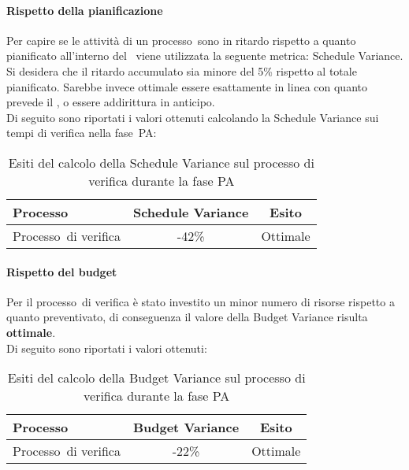 \documentclass[../PianoDiQualifica.tex]{subfiles}
\begin{document}
\begin{appendices}
			\paragraph{Rispetto della pianificazione}
			Per capire se le attività di un processo\g\ sono in ritardo rispetto a quanto pianificato all'interno del \pianodiprogetto\ viene utilizzata la seguente metrica: Schedule Variance.\\
			Si desidera che il ritardo accumulato sia minore del 5\% rispetto al totale pianificato. Sarebbe invece ottimale essere esattamente in linea con quanto prevede il \pianodiprogetto, o essere addirittura in anticipo.\\
			Di seguito sono riportati i valori ottenuti calcolando la Schedule Variance sui tempi di verifica nella fase\g\ PA:
			\begin{table}[H]
				\centering
				\begin{tabular}{l * {2}{c}}
					\toprule
					\textbf{Processo} & \textbf{Schedule Variance} & \textbf{Esito} \\
					\midrule
					Processo\g\ di verifica & -42\% &  Ottimale \\
					\bottomrule
				\end{tabular}
				\caption{Esiti del calcolo della Schedule Variance sul processo di verifica durante la fase PA}
				\label{tab:esiti_schedule_variance}
			\end{table}
			
			\paragraph{Rispetto del budget}
			Per il processo\g\ di verifica è stato investito un minor numero di risorse rispetto a quanto preventivato, di conseguenza il valore della Budget Variance risulta \textbf{ottimale}.\\
			Di seguito sono riportati i valori ottenuti:
			\begin{table}[H]
				\centering
				\begin{tabular}{l * {2}{c}}
					\toprule
					\textbf{Processo} & \textbf{Budget Variance} & \textbf{Esito} \\
					\midrule
					Processo\g\ di verifica & -22\% &  Ottimale \\
					\bottomrule
				\end{tabular}
				\caption{Esiti del calcolo della Budget Variance sul processo di verifica durante la fase PA}
				\label{tab:esiti_budget_variance}
			\end{table}
			

\end{appendices}
\end{document}
